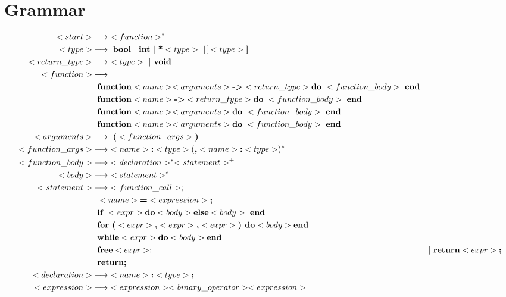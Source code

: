 \documentclass{article}
\begin{document}
\section{Grammar}
\begin{align*}
<start> &\longrightarrow \ <function>^* \\
<type> &\longrightarrow \ \textbf{bool} \ | \ \textbf{int} \ | \ \textbf{*} <type> \ | \textbf{[} <type> \textbf{]}\\
<return\_type> &\longrightarrow \ <type> \ | \ \textbf{void} \\
<function>  &\longrightarrow \\ 
    &| \ \textbf{function} <name> <arguments> \textbf{-\textgreater} <return\_type> \textbf{do} \ <function\_body> \ \textbf{end} \\
    &| \ \textbf{function} <name> \textbf{-\textgreater} <return\_type> \textbf{do} \ <function\_body> \ \textbf{end} 
    \\
    &| \ \textbf{function} <name> <arguments> \textbf{do} \ <function\_body> \ \textbf{end} \\
    &| \ \textbf{function} <name> <arguments> \textbf{do} \ <function\_body> \ \textbf{end} \\
<arguments> &\longrightarrow \ \textbf{(} <function\_args>\textbf{)} \\
<function\_args> &\longrightarrow \ <name> \textbf{:} <type> (\textbf{,} <name> \textbf{:} <type>)^* \\
<function\_body> &\longrightarrow \ <declaration>^* <statement>^+ \\
<body> &\longrightarrow \ <statement>^* \\
<statement> &\longrightarrow \ <function\_call>; \\
    &| \ <name> \textbf{=} <expression> \textbf{;}\\ 
    &| \ \textbf{if } <expr> \textbf{do} <body> \textbf{else} <body>  \ \textbf{end} \\
    &| \ \textbf{for (} <expr> \textbf{,} <expr> \textbf{,} <expr> \textbf{) do} <body> \textbf{end} \\ 
    &| \ \textbf{while} <expr> \textbf{do} <body> \textbf{end} \\
    &| \ \textbf{free} <expr>;
    &| \ \textbf{return} <expr> \textbf{;} \\
    &| \ \textbf{return;} \\
<declaration>  &\longrightarrow \ <name> \textbf{:} <type> \textbf{;} \\
<expression> &\longrightarrow \ <expression> <binary\_operator> <expression> \\

\end{align*}
\end{document}
